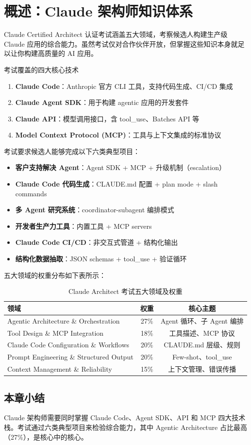\section{概述：Claude 架构师知识体系}

Claude Certified Architect 认证考试涵盖五大领域，考察候选人构建生产级 Claude 应用的综合能力。虽然考试仅对合作伙伴开放，但掌握这些知识本身就足以让你构建高质量的 AI 应用。

\begin{importantbox}{考试覆盖的四大核心技术}
\begin{enumerate}[leftmargin=1.5em]
    \item \textbf{Claude Code}：Anthropic 官方 CLI 工具，支持代码生成、CI/CD 集成
    \item \textbf{Claude Agent SDK}：用于构建 agentic 应用的开发套件
    \item \textbf{Claude API}：模型调用接口，含 tool\_use、Batches API 等
    \item \textbf{Model Context Protocol (MCP)}：工具与上下文集成的标准协议
\end{enumerate}
\end{importantbox}

考试要求候选人能够完成以下六类典型项目：

\begin{itemize}[leftmargin=1.5em]
    \item \textbf{客户支持解决 Agent}：Agent SDK + MCP + 升级机制（escalation）
    \item \textbf{Claude Code 代码生成}：CLAUDE.md 配置 + plan mode + slash commands
    \item \textbf{多 Agent 研究系统}：coordinator-subagent 编排模式
    \item \textbf{开发者生产力工具}：内置工具 + MCP servers
    \item \textbf{Claude Code CI/CD}：非交互式管道 + 结构化输出
    \item \textbf{结构化数据抽取}：JSON schemas + tool\_use + 验证循环
\end{itemize}

五大领域的权重分布如下表所示：

\begin{table}[H]
\centering
\begin{tabular}{lcc}
\toprule
\textbf{领域} & \textbf{权重} & \textbf{核心主题} \\
\midrule
Agentic Architecture \& Orchestration & 27\% & Agent 循环、子 Agent 编排 \\
Tool Design \& MCP Integration & 18\% & 工具描述、MCP 协议 \\
Claude Code Configuration \& Workflows & 20\% & CLAUDE.md 层级、规则 \\
Prompt Engineering \& Structured Output & 20\% & Few-shot、tool\_use \\
Context Management \& Reliability & 15\% & 上下文管理、错误传播 \\
\bottomrule
\end{tabular}
\caption{Claude Architect 考试五大领域及权重}
\end{table}

\subsection{本章小结}

Claude 架构师需要同时掌握 Claude Code、Agent SDK、API 和 MCP 四大技术栈。考试通过六类典型项目来检验综合能力，其中 Agentic Architecture 占比最高（27\%），是核心中的核心。


